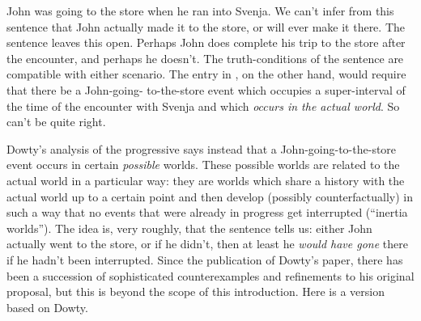 \ex {}%
John was going to the store when he ran into Svenja.\label{ex:interrupt} \xe
%
We can't infer from this sentence that John actually made it to the store, or
will ever make it there. The sentence leaves this open. Perhaps John does
complete his trip to the store after the encounter, and perhaps he doesn't. The
truth-conditions of the sentence \Last are compatible with either scenario. The
entry in \LLast, on the other hand, would require that there be a John-going-
to-the-store event which occupies a super-interval of the time of the encounter
with Svenja and which \emph{occurs in the actual world}. So \LLast can't be quite
right.

Dowty's analysis of the progressive says instead that a John-going-to-the-store
event occurs in certain \emph{possible} worlds. These possible worlds are
related to the actual world in a particular way: they are worlds which share a
history with the actual world up to a certain point and then develop (possibly
counterfactually) in such a way that no events that were already in progress get
interrupted (``inertia worlds''). The idea is, very roughly, that the sentence
tells us: either John actually went to the store, or if he didn't, then at least
he \emph{would have gone} there if he hadn't been interrupted. %
%
Since the publication of Dowty's paper, there has been a succession of
sophisticated counterexamples and refinements to his original proposal, but this
is beyond the scope of this introduction. Here is a version based on Dowty.


